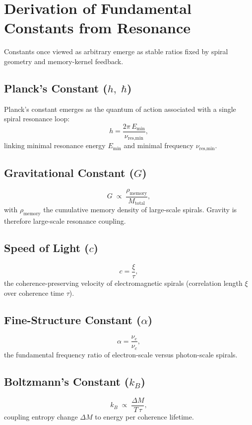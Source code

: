 \section{Derivation of Fundamental Constants from Resonance}

\begin{concept}
Constants once viewed as arbitrary emerge as stable ratios fixed by spiral
geometry and memory-kernel feedback.
\end{concept}

\subsection*{Planck’s Constant ($h,\;\hbar$)}
Planck’s constant emerges as the quantum of action associated with a single
spiral resonance loop:
\[
h=\frac{2\pi\,E_{\min}}{\nu_{\text{res,min}}},
\]
linking minimal resonance energy $E_{\min}$ and minimal frequency
$\nu_{\text{res,min}}$.

\subsection*{Gravitational Constant ($G$)}
\[
G \;\propto\; \frac{\rho_{\text{memory}}}{M_{\text{total}}},
\]
with $\rho_{\text{memory}}$ the cumulative memory density of large-scale
spirals.  Gravity is therefore large-scale resonance coupling.

\subsection{Speed of Light ($c$)}
\[
c = \frac{\xi}{\tau},
\]
the coherence-preserving velocity of electromagnetic spirals (correlation
length $\xi$ over coherence time $\tau$).

\subsection{Fine-Structure Constant ($\alpha$)}
\[
\alpha = \frac{\nu_e}{\nu_c},
\]
the fundamental frequency ratio of electron-scale versus photon-scale
spirals.

\subsection{Boltzmann’s Constant ($k_B$)}
\[
k_B \;\propto\; \frac{\Delta M}{T\,\tau},
\]
coupling entropy change $\Delta M$ to energy per coherence lifetime.

